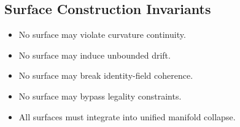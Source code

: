 \subsection{Surface Construction Invariants}
\begin{itemize}
    \item No surface may violate curvature continuity.
    \item No surface may induce unbounded drift.
    \item No surface may break identity-field coherence.
    \item No surface may bypass legality constraints.
    \item All surfaces must integrate into unified manifold collapse.
\end{itemize}
